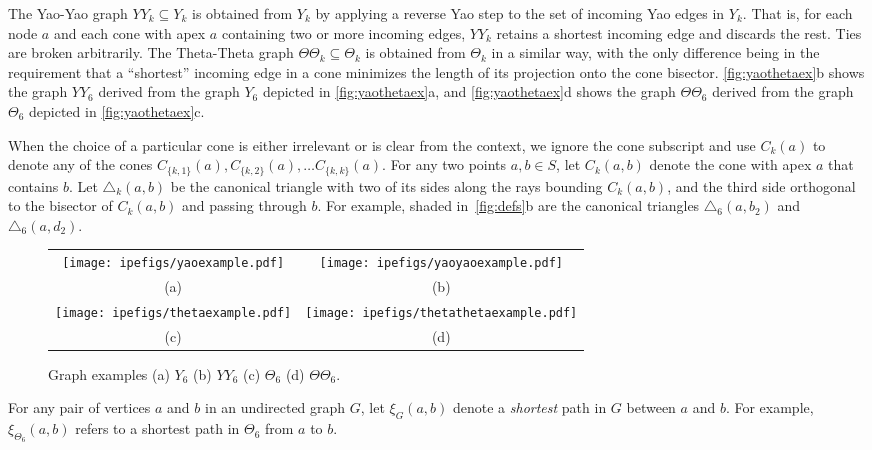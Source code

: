 \documentclass[runningheads,a4paper]{llncs}
\newcommand{\pp}{\xi}
\begin{document}
The Yao-Yao graph $YY_k \subseteq Y_k$ is obtained from $Y_k$ by applying a reverse Yao step to the set of incoming Yao edges in $Y_k$. That is, for each node $a$  and each cone with apex $a$ containing two or more incoming edges, $YY_k$ retains a shortest incoming edge and discards the rest. Ties are broken arbitrarily.  The Theta-Theta graph $\Theta\Theta_k \subseteq \Theta_k$ is obtained from $\Theta_k$ in a similar way, with the only difference being in the requirement that a ``shortest'' incoming edge 
in a  cone minimizes the length of its projection onto the cone bisector.
\autoref{fig:yaothetaex}b shows the graph $YY_6$ derived from the graph $Y_6$ depicted in  \autoref{fig:yaothetaex}a, and  
\autoref{fig:yaothetaex}d shows the graph $\Theta\Theta_6$ derived from the graph $\Theta_6$ depicted in  \autoref{fig:yaothetaex}c. 

When the choice of a particular cone is either irrelevant or is clear from the context, we ignore the cone subscript and use $C_k(a)$ to denote any of the cones $C_{\{k,1\}}(a), C_{\{k,2\}}(a), \ldots C_{\{k,k\}}(a)$.  For any two points $a, b \in S$, let $C_k(a,b)$ denote the cone with apex $a$ that contains $b$.  Let $\triangle_k(a, b)$ be the canonical triangle with two of its sides along the rays bounding $C_{k}(a,b)$, and the third side orthogonal to the bisector of 
$C_{k}(a,b)$ and passing through $b$. For example, shaded in~\autoref{fig:defs}b are the canonical triangles $\triangle_6(a, b_2)$ and $\triangle_6(a, d_2)$. 

\begin{figure}[htbp]
\centering
\begin{tabular}{c@{\hspace{0.1\linewidth}}c}
\texttt{[image: ipefigs/yaoexample.pdf]} & 
\texttt{[image: ipefigs/yaoyaoexample.pdf]} \\
(a) & (b) \\
\texttt{[image: ipefigs/thetaexample.pdf]} & 
\texttt{[image: ipefigs/thetathetaexample.pdf]} \\
(c) & (d) 
\end{tabular}
\caption{Graph examples (a) $Y_6$ (b) $YY_6$ (c) $\Theta_6$ (d) $\Theta\Theta_6$.}
\label{fig:yaothetaex}
\end{figure}


For any pair of vertices $a$ and $b$ in an undirected graph $G$, let $\pp_G(a, b)$ denote a \emph{shortest} path in $G$ between $a$ and $b$. 
For example, $\pp_{\Theta_6}(a, b)$ refers to a shortest path in $\Theta_6$ from $a$ to $b$. 
\end{document}
